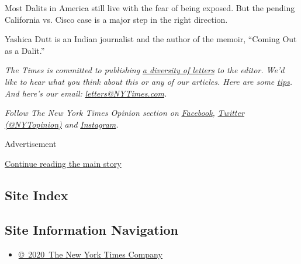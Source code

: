 Most Dalits in America still live with the fear of being exposed. But
the pending California vs. Cisco case is a major step in the right
direction.

Yashica Dutt is an Indian journalist and the author of the memoir,
``Coming Out as a Dalit.''

\emph{The Times is committed to publishing}
\href{https://www.nytimes3xbfgragh.onion/2019/01/31/opinion/letters/letters-to-editor-new-york-times-women.html}{\emph{a
diversity of letters}} \emph{to the editor. We'd like to hear what you
think about this or any of our articles. Here are some}
\href{https://help.nytimes3xbfgragh.onion/hc/en-us/articles/115014925288-How-to-submit-a-letter-to-the-editor}{\emph{tips}}\emph{.
And here's our email:}
\href{mailto:letters@NYTimes.com}{\emph{letters@NYTimes.com}}\emph{.}

\emph{Follow The New York Times Opinion section on}
\href{https://www.facebookcorewwwi.onion/nytopinion}{\emph{Facebook}}\emph{,}
\href{http://twitter.com/NYTOpinion}{\emph{Twitter (@NYTopinion)}}
\emph{and}
\href{https://www.instagram.com/nytopinion/}{\emph{Instagram}}\emph{.}

Advertisement

\protect\hyperlink{after-bottom}{Continue reading the main story}

\hypertarget{site-index}{%
\subsection{Site Index}\label{site-index}}

\hypertarget{site-information-navigation}{%
\subsection{Site Information
Navigation}\label{site-information-navigation}}

\begin{itemize}
\tightlist
\item
  \href{https://help.nytimes3xbfgragh.onion/hc/en-us/articles/115014792127-Copyright-notice}{©~2020~The
  New York Times Company}
\end{itemize}

